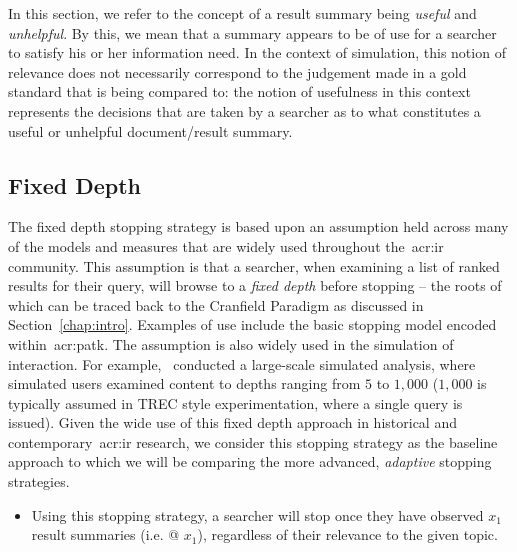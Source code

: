 \noindent{} In this section, we refer to the concept of a result summary being \emph{useful} and \emph{unhelpful}. By this, we mean that a summary appears to be of use for a searcher to satisfy his or her information need. In the context of simulation, this notion of relevance does not necessarily correspond to the judgement made in a gold standard that is being compared to: the notion of usefulness in this context represents the decisions that are taken by a searcher as to what constitutes a useful or unhelpful document/result summary.

\subsection{Fixed Depth}
The fixed depth stopping strategy is based upon an assumption held across many of the models and measures that are widely used throughout the~\gls{acr:ir} community. This assumption is that a searcher, when examining a list of ranked results for their query, will browse to a \emph{fixed depth} before stopping -- the roots of which can be traced back to the Cranfield Paradigm as discussed in Section~\ref{chap:intro}. Examples of use include the basic stopping model encoded within~\gls{acr:patk}. The assumption is also widely used in the simulation of interaction. For example,~\cite{azzopardi2011economics} conducted a large-scale simulated analysis, where simulated users examined content to depths ranging from $5$ to $1,000$ ($1,000$ is typically assumed in TREC style experimentation, where a single query is issued). Given the wide use of this fixed depth approach in historical and contemporary~\gls{acr:ir} research, we consider this stopping strategy as the baseline approach to which we will be comparing the more advanced, \emph{adaptive} stopping strategies.

\begin{itemize}
    
    \item[]{} Using this stopping strategy, a searcher will stop once they have observed $x_1$ result summaries (i.e.  @ $x_1$), regardless of their relevance to the given topic.
    
\end{itemize}

